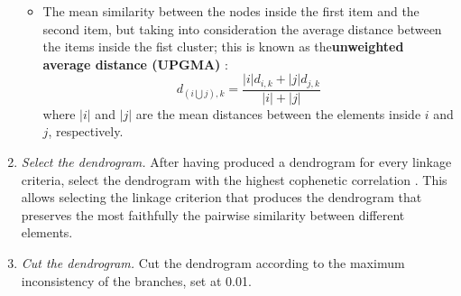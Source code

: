 \documentclass[twocolumn]{article}
\begin{document}
\begin{appendices}
\begin{enumerate}
\begin{itemize}
				      \item	The mean similarity between the nodes inside the first item and the second item, but taking into consideration the average distance between the items inside the fist cluster;
				            this is known as the\textbf{unweighted average distance (UPGMA)} \citep{Sokal1958}:
				            \begin{equation}
					            d_{(i \bigcup j),k}=\frac{|i|d_{i,k}+|j|d_{j,k}}{|i|+|j|} \label{eqn:UPGMA}
				            \end{equation}
										where $|i|$ and $|j|$ are the mean distances between the elements inside $i$ and $j$, respectively.
			      \end{itemize}
			\item \emph{Select the dendrogram.} \smallskip \newline
						After having produced a dendrogram for every linkage criteria, select the dendrogram with the highest cophenetic correlation \citep{Sokal1962}.
			      This allows selecting the linkage criterion that produces the dendrogram that preserves the most faithfully the pairwise similarity between different elements.
			\item \emph{Cut the dendrogram.} \smallskip \newline
			      Cut the dendrogram according to the maximum inconsistency of the branches, set at 0.01.
		\end{enumerate}

\end{appendices}
\end{document}
